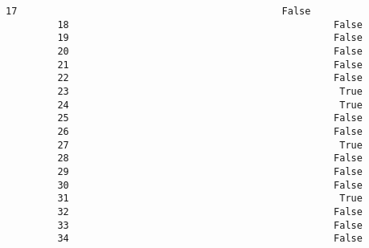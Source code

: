 \documentclass[11pt]{article}
\begin{document}
\begin{Verbatim}[commandchars=\\\{\}]
         17                                              False                                                                                      
         18                                              False                                                                                      
         19                                              False                                                                                      
         20                                              False                                                                                      
         21                                              False                                                                                      
         22                                              False                                                                                      
         23                                               True                                                                                      
         24                                               True                                                                                      
         25                                              False                                                                                      
         26                                              False                                                                                      
         27                                               True                                                                                      
         28                                              False                                                                                      
         29                                              False                                                                                      
         30                                              False                                                                                      
         31                                               True                                                                                      
         32                                              False                                                                                      
         33                                              False                                                                                      
         34                                              False                                                                                      

\end{Verbatim}
\end{document}
